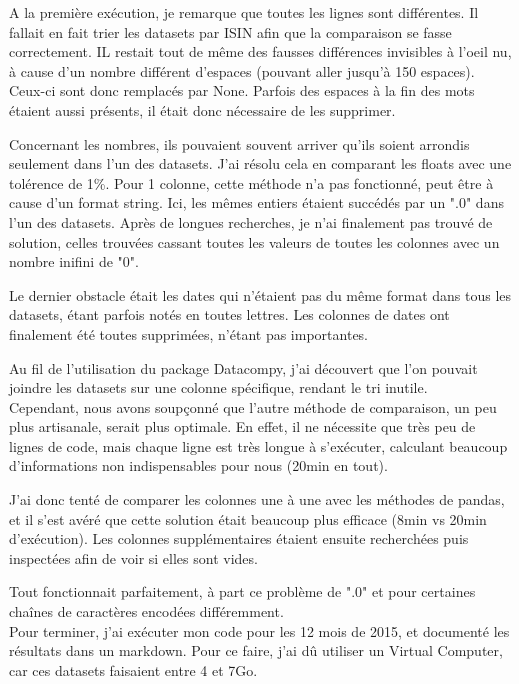 A la première exécution, je remarque que toutes les lignes sont différentes. Il fallait en fait trier les datasets par ISIN afin que la comparaison se fasse correctement.
IL restait tout de même des fausses différences invisibles à l'oeil nu, à cause d'un nombre différent d'espaces (pouvant aller jusqu'à 150 espaces). Ceux-ci sont donc remplacés par None.
Parfois des espaces à la fin des mots étaient aussi présents, il était donc nécessaire de les supprimer. 

Concernant les nombres, ils pouvaient souvent arriver qu'ils soient arrondis seulement dans l'un des datasets.
J'ai résolu cela en comparant les floats avec une tolérence de 1\%.
Pour 1 colonne, cette méthode n'a pas fonctionné, peut être à cause d'un format string. 
Ici, les mêmes entiers étaient succédés par un ".0" dans l'un des datasets.
Après de longues recherches, je n'ai finalement pas trouvé de solution, celles trouvées cassant toutes les valeurs de toutes les colonnes avec un nombre inifini de "0".

Le dernier obstacle était les dates qui n'étaient pas du même format dans tous les datasets, étant parfois notés en toutes lettres.
Les colonnes de dates ont finalement été toutes supprimées, n'étant pas importantes.

Au fil de l'utilisation du package Datacompy, j'ai découvert que l'on pouvait joindre les datasets sur une colonne spécifique, rendant le tri inutile.
\\

Cependant, nous avons soupçonné que l'autre méthode de comparaison, un peu plus artisanale, serait plus optimale.
En effet, il ne nécessite que très peu de lignes de code, mais chaque ligne est très longue à s'exécuter, calculant beaucoup d'informations non indispensables pour nous (20min en tout).

J'ai donc tenté de comparer les colonnes une à une avec les méthodes de pandas, et il s'est avéré que cette solution était beaucoup plus efficace (8min vs 20min d'exécution).
Les colonnes supplémentaires étaient ensuite recherchées puis inspectées afin de voir si elles sont vides.

Tout fonctionnait parfaitement, à part ce problème de ".0" et pour certaines chaînes de caractères encodées différemment.
\\

Pour terminer, j'ai exécuter mon code pour les 12 mois de 2015, et documenté les résultats dans un markdown.
Pour ce faire, j'ai dû utiliser un Virtual Computer, car ces datasets faisaient entre 4 et 7Go.

